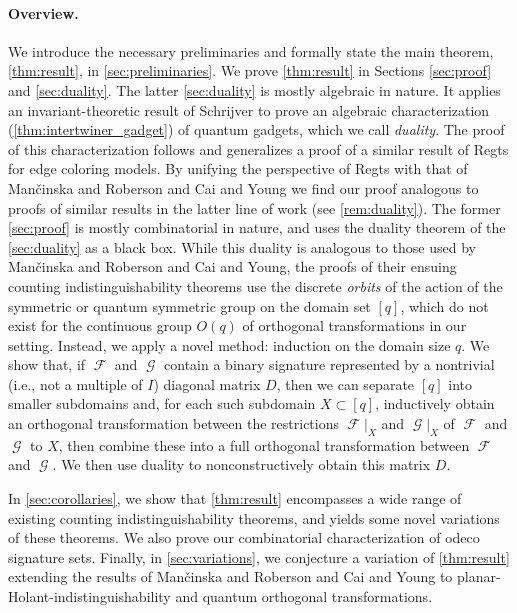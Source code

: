 \documentclass{article}
\DeclareMathOperator{\fc}{\mathcal{F}}
\DeclareMathOperator{\gc}{\mathcal{G}}
\begin{document}
\paragraph{Overview.}
We introduce the necessary preliminaries and formally state the main theorem, 
\autoref{thm:result}, in 
\autoref{sec:preliminaries}. We prove \autoref{thm:result} in Sections
\ref{sec:proof} and \ref{sec:duality}. The latter \autoref{sec:duality} is mostly algebraic in nature.
It applies an invariant-theoretic result of Schrijver \cite{schrijver_tensor_2008} to prove 
an algebraic characterization (\autoref{thm:intertwiner_gadget}) of quantum gadgets,
which we call \emph{duality}.
The proof of this characterization follows and generalizes a proof of a similar result of 
Regts \cite{regts_rank_2012}
for edge coloring models. By unifying the perspective of Regts with that of
Man\v{c}inska and Roberson and Cai and Young \cite{planar, cai_planar_2023, young2022equality}
we find our proof analogous to proofs of similar results in the latter line of work
(see \autoref{rem:duality}). 
The former \autoref{sec:proof} is mostly combinatorial in nature, and uses the duality theorem of the 
\autoref{sec:duality} as a black box. While this duality is analogous to those used by
Man\v{c}inska and Roberson and Cai and Young, the proofs of their ensuing
counting indistinguishability theorems use the discrete \emph{orbits}
of the action of the symmetric or quantum symmetric group on the domain set 
$[q]$, which do not exist for the continuous group $O(q)$ of orthogonal transformations in
our setting. Instead, we apply a novel method: induction on the domain size $q$. 
We show that, if $\fc$ and $\gc$ contain a binary signature
represented by a nontrivial (i.e., not a multiple of $I$) diagonal matrix $D$, 
then we can separate $[q]$ into smaller subdomains and, for each such subdomain 
$X \subset [q]$, inductively obtain an orthogonal transformation between the restrictions
$\fc|_X$ and $\gc|_X$ of $\fc$ and $\gc$ to $X$,
then combine these into a full orthogonal transformation between $\fc$ and $\gc$. 
We then use duality to nonconstructively obtain this matrix $D$.

In \autoref{sec:corollaries}, we show that \autoref{thm:result} 
encompasses a wide range of existing counting indistinguishability theorems,
and yields some novel variations of these theorems. We also prove our combinatorial characterization of
odeco signature sets.
Finally, in \autoref{sec:variations}, we conjecture a variation of \autoref{thm:result}
extending the results 
of Man\v{c}inska and Roberson \cite{planar} and Cai and Young \cite{cai_planar_2023} 
to planar-Holant-indistinguishability and quantum orthogonal transformations.
\end{document}
